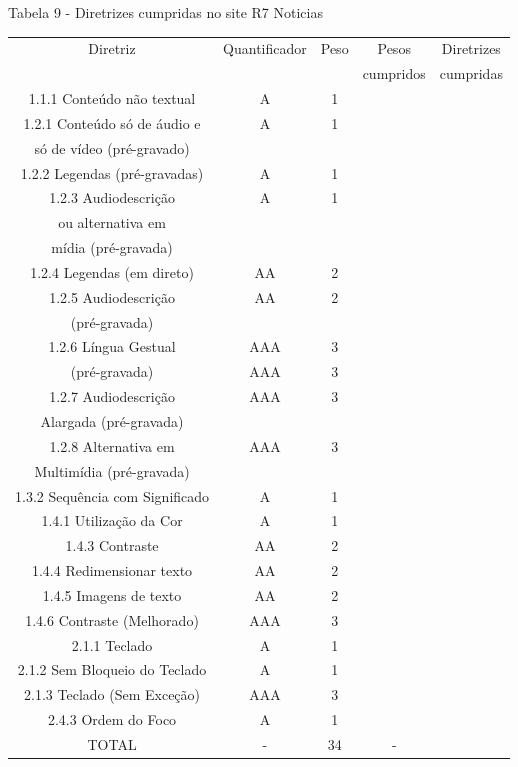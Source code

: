 \documentclass[a4paper]{article}
\begin{document}
\begin{titlepage}
Tabela 9 - Diretrizes cumpridas no site R7 Noticias\\[-1cm]
\begin{center}
	\fontsize{8pt}{8pt}\selectfont	
	\begin{longtable}{|c|c|c|c|c|}
		\hline
		Diretriz & Quantificador & Peso & Pesos & Diretrizes\\
		& & & cumpridos & cumpridas\\
		\hline
		1.1.1 Conteúdo não textual & A & 1 & & \\
		\hline
		1.2.1 Conteúdo só de áudio e & A & 1 & & \\
		só de vídeo (pré-gravado) & & & & \\
		\hline
		1.2.2 Legendas (pré-gravadas) & A & 1 & & \\
		\hline
		1.2.3 Audiodescrição & A & 1 & & \\
		ou alternativa em & & & & \\
		mídia (pré-gravada) & & & & \\
		\hline
		1.2.4 Legendas (em direto) & AA & 2 & & \\
		\hline
		1.2.5 Audiodescrição & AA & 2 & & \\
		(pré-gravada) & & & & \\
		\hline
		1.2.6 Língua Gestual & AAA & 3 & & \\
		(pré-gravada) & AAA & 3 & & \\
		\hline
		1.2.7 Audiodescrição & AAA & 3 & & \\
		Alargada (pré-gravada) & & & & \\
		\hline
		1.2.8 Alternativa em & AAA & 3 & & \\
		Multimídia (pré-gravada) & & & & \\
		\hline
		1.3.2 Sequência com Significado & A & 1 & & \\
		\hline
		1.4.1 Utilização da Cor & A & 1 & & \\
		\hline
		1.4.3 Contraste & AA & 2 & & \\
		\hline
		1.4.4 Redimensionar texto & AA & 2 & & \\
		\hline
		1.4.5 Imagens de texto & AA & 2 & & \\
		\hline
		1.4.6 Contraste (Melhorado) & AAA & 3 & & \\
		\hline
		2.1.1 Teclado & A & 1 & & \\
		\hline
		2.1.2 Sem Bloqueio do Teclado & A & 1 & & \\
		\hline
		2.1.3 Teclado (Sem Exceção) & AAA & 3 & & \\
		\hline
		2.4.3 Ordem do Foco & A & 1 & & \\
		\hline
		TOTAL & - & 34 & - & \\
		\hline
	\end{longtable}
\end{center}


\end{titlepage}
\end{document}

